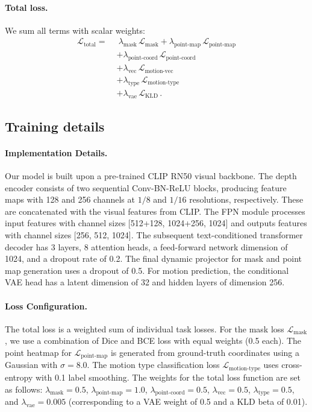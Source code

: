 \paragraph{Total loss.} We sum all terms with scalar weights:
\begin{align*}
\mathcal{L}_{\text{total}} =\;&\ 
    \lambda_{\text{mask}}\, \mathcal{L}_{\text{mask}}
  + \lambda_{\text{point-map}}\, \mathcal{L}_{\text{point-map}} \\
  &+ \lambda_{\text{point-coord}}\, \mathcal{L}_{\text{point-coord}} \\
  &+ \lambda_{\text{vec}}\, \mathcal{L}_{\text{motion-vec}} \\
  &+ \lambda_{\text{type}}\, \mathcal{L}_{\text{motion-type}} \\
  &+ \lambda_{\text{vae}}\, \mathcal{L}_{\text{KLD}}\,.
\end{align*}

\subsection{Training details}

\paragraph{Implementation Details.}
Our model is built upon a pre-trained CLIP RN50 visual backbone. The depth encoder consists of two sequential Conv-BN-ReLU blocks, producing feature maps with 128 and 256 channels at $1/8$ and $1/16$ resolutions, respectively. These are concatenated with the visual features from CLIP. The FPN module processes input features with channel sizes [512+128, 1024+256, 1024] and outputs features with channel sizes [256, 512, 1024]. The subsequent text-conditioned transformer decoder has 3 layers, 8 attention heads, a feed-forward network dimension of 1024, and a dropout rate of 0.2. The final dynamic projector for mask and point map generation uses a dropout of 0.5. For motion prediction, the conditional VAE head has a latent dimension of 32 and hidden layers of dimension 256.

\paragraph{Loss Configuration.}
The total loss is a weighted sum of individual task losses. For the mask loss $\mathcal{L}_{\text{mask}}$, we use a combination of Dice and BCE loss with equal weights (0.5 each). The point heatmap for $\mathcal{L}_{\text{point-map}}$ is generated from ground-truth coordinates using a Gaussian with $\sigma=8.0$. The motion type classification loss $\mathcal{L}_{\text{motion-type}}$ uses cross-entropy with 0.1 label smoothing. The weights for the total loss function are set as follows: $\lambda_{\text{mask}}=0.5$, $\lambda_{\text{point-map}}=1.0$, $\lambda_{\text{point-coord}}=0.5$, $\lambda_{\text{vec}}=0.5$, $\lambda_{\text{type}}=0.5$, and $\lambda_{\text{vae}}=0.005$ (corresponding to a VAE weight of 0.5 and a KLD beta of 0.01).


